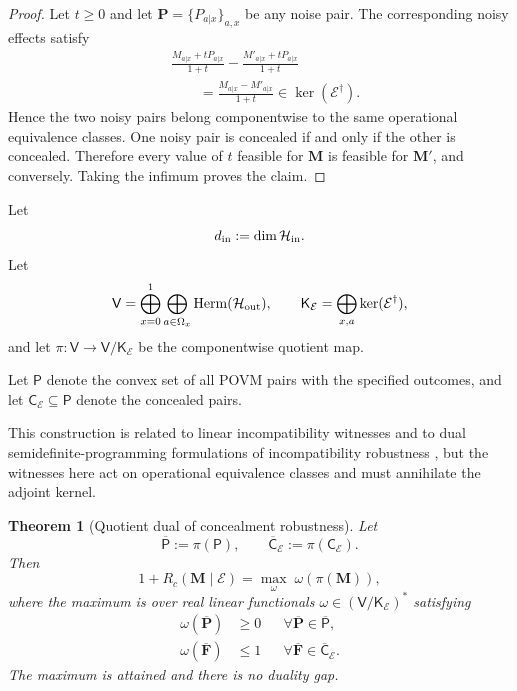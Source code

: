 \documentclass[
aps,pra,twocolumn,10pt,
superscriptaddress,longbibliography,floatfix
]{revtex4-2}
\DeclareMathOperator{\Herm}{Herm}
\newtheorem{theorem}{Theorem}[section]
\begin{document}
\begin{proof}
Let $t\ge0$ and let $\mathbf P=\{P_{a|x}\}_{a,x}$ be any noise pair. The corresponding noisy effects satisfy
\begin{align*}
&\frac{M_{a|x}+tP_{a|x}}{1+t}
-
\frac{M'_{a|x}+tP_{a|x}}{1+t}\\
&\qquad=
\frac{M_{a|x}-M'_{a|x}}{1+t}
\in\ker(\mathcal E^\dagger).
\end{align*}
Hence the two noisy pairs belong componentwise to the same operational equivalence classes. One noisy pair is concealed if and only if the other is concealed. Therefore every value of $t$ feasible for $\mathbf M$ is feasible for $\mathbf M'$, and conversely. Taking the infimum proves the claim.
\end{proof}

Let
\[
d_{\rm in}:=\dim\mathcal H_{\rm in}.
\]
Let
\[
\mathsf V
=
\bigoplus_{x=0}^{1}
\bigoplus_{a\in\Omega_x}
\Herm(\mathcal H_{\rm out}),
\qquad
\mathsf K_{\mathcal E}
=
\bigoplus_{x,a}\ker(\mathcal E^\dagger),
\]
and let $\pi:\mathsf V\to\mathsf V/\mathsf K_{\mathcal E}$ be the componentwise quotient map.

Let $\mathsf P$ denote the convex set of all POVM pairs with the specified outcomes, and let $\mathsf C_{\mathcal E}\subseteq\mathsf P$ denote the concealed pairs.

This construction is related to linear incompatibility witnesses \cite{Carmeli2019} and to dual semidefinite-programming formulations of incompatibility robustness \cite{Designolle2019}, but the witnesses here act on operational equivalence classes and must annihilate the adjoint kernel.

\begin{theorem}[Quotient dual of concealment robustness]
\label{thm:quotient_dual}
Let
\[
\overline{\mathsf P}:=\pi(\mathsf P),
\qquad
\overline{\mathsf C}_{\mathcal E}
:=
\pi(\mathsf C_{\mathcal E}).
\]
Then
\begin{equation}
\label{eq:quotient_dual}
1+R_c(\mathbf M\mid\mathcal E)
=
\max_{\omega}\;
\omega\!\left(\pi(\mathbf M)\right),
\end{equation}
where the maximum is over real linear functionals
$\omega\in(\mathsf V/\mathsf K_{\mathcal E})^*$ satisfying
\begin{align}
\omega(\overline{\mathbf P})&\ge0
&&
\forall\overline{\mathbf P}\in\overline{\mathsf P},
\label{eq:dual_noise_positive}\\
\omega(\overline{\mathbf F})&\le1
&&
\forall\overline{\mathbf F}
\in\overline{\mathsf C}_{\mathcal E}.
\label{eq:dual_free_bound}
\end{align}
The maximum is attained and there is no duality gap.
\end{theorem}
\end{document}
